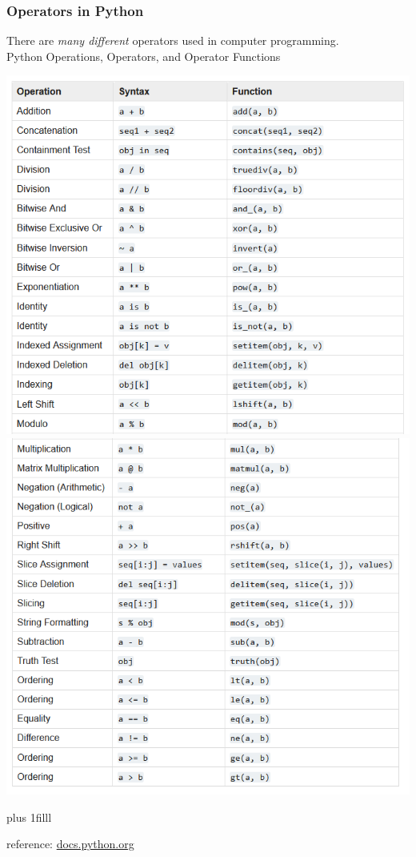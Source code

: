 \documentclass[fleqn]{beamer} %
\newcommand{\sectiontitleI}{Operators in Python} %
\newcommand{\btVFill}{\vskip0pt plus 1filll}
\begin{document}
	\begin{frame}[label=sectionI] \small
		\frametitle{\sectiontitleI}
		
		There are {\it many different} {\BL operators} used in computer programming.  \vspace{5mm}\\
		
		Python Operations, Operators, and Operator Functions  

	    \includegraphics[scale=.375]{operator_list_part1.png}\includegraphics[scale=.375]{operator_list_part2.png}
	
		
		\btVFill
		
		\tiny{reference: \href{https://docs.python.org/3/library/operator.html}{docs.python.org} } 	
			
	\end{frame}
\end{document}
